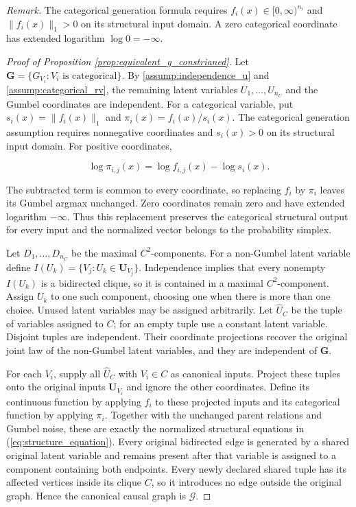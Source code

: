 \noindent\textit{Remark.} The categorical generation formula requires $f_i(x)\in[0,\infty)^{n_i}$ and $\|f_i(x)\|_1>0$ on its structural input domain. A zero categorical coordinate has extended logarithm $\log0=-\infty$.

\begin{proof}[Proof of Proposition \ref{prop:equivalent_g_constrianed}]
Let $\boldsymbol G=\{G_{V_i}:V_i\text{ is categorical}\}$. By \cref{assump:independence_u} and \cref{assump:categorical_rv}, the remaining latent variables $U_1,\ldots,U_{n_U}$ and the Gumbel coordinates are independent. For a categorical variable, put $s_i(x)=\|f_i(x)\|_1$ and $\pi_i(x)=f_i(x)/s_i(x)$. The categorical generation assumption requires nonnegative coordinates and $s_i(x)>0$ on its structural input domain. For positive coordinates,

\[
\log\pi_{i,j}(x)=\log f_{i,j}(x)-\log s_i(x).
\]

The subtracted term is common to every coordinate, so replacing $f_i$ by $\pi_i$ leaves its Gumbel argmax unchanged. Zero coordinates remain zero and have extended logarithm $-\infty$. Thus this replacement preserves the categorical structural output for every input and the normalized vector belongs to the probability simplex. 

Let $D_1,\ldots,D_{n_C}$ be the maximal $C^2$-components. For a non-Gumbel latent variable define $I(U_k)=\{V_j:U_k\in\boldsymbol U_{V_j}\}$. Independence implies that every nonempty $I(U_k)$ is a bidirected clique, so it is contained in a maximal $C^2$-component. Assign $U_k$ to one such component, choosing one when there is more than one choice. Unused latent variables may be assigned arbitrarily. Let $\hat U_C$ be the tuple of variables assigned to $C$; for an empty tuple use a constant latent variable. Disjoint tuples are independent. Their coordinate projections recover the original joint law of the non-Gumbel latent variables, and they are independent of $\boldsymbol G$. 

For each $V_i$, supply all $\hat U_C$ with $V_i\in C$ as canonical inputs. Project these tuples onto the original inputs $\boldsymbol U_{V_i}$ and ignore the other coordinates. Define its continuous function by applying $f_i$ to these projected inputs and its categorical function by applying $\pi_i$. Together with the unchanged parent relations and Gumbel noise, these are exactly the normalized structural equations in (\ref{eq:structure_equation}). Every original bidirected edge is generated by a shared original latent variable and remains present after that variable is assigned to a component containing both endpoints. Every newly declared shared tuple has its affected vertices inside its clique $C$, so it introduces no edge outside the original graph. Hence the canonical causal graph is $\mathcal G$. 


\end{proof}
